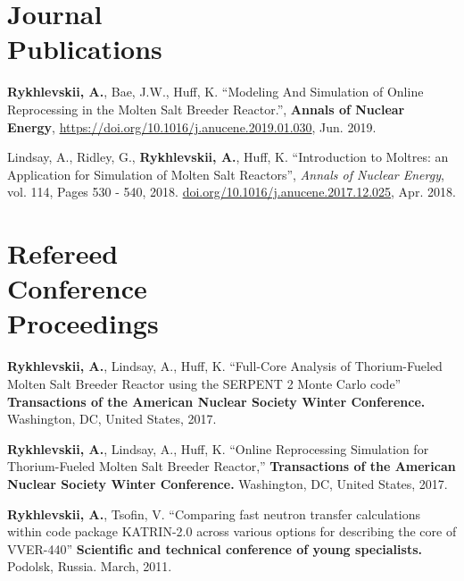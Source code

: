 \documentclass[margin,line]{resume}
\newcommand{\Cyclus}{\textsc{Cyclus}\xspace}%
\begin{document}
\begin{resume}
    \section{\mysidestyle Journal\\Publications}
      \begin{bibenum}
	    \item \textbf{Rykhlevskii, A.}, Bae, J.W., Huff, K. ``Modeling And Simulation of Online Reprocessing in the Molten Salt Breeder Reactor.'', \textbf{Annals of Nuclear Energy}, 
               \url{https://doi.org/10.1016/j.anucene.2019.01.030}, 
               Jun. 2019.
       \item Lindsay, A., Ridley, G., \textbf{Rykhlevskii, A.}, Huff, K. ``Introduction to 
               Moltres: an Application for Simulation of Molten Salt 
               Reactors'',  \textsl{Annals of Nuclear Energy}, vol. 114, Pages 530 - 540, 2018. \url{doi.org/10.1016/j.anucene.2017.12.025}, Apr. 2018.
      \end{bibenum}
\vspace{2mm} %
    \section{\mysidestyle Refereed\\Conference\\Proceedings}
    \begin{bibenum}
    \item \textbf{Rykhlevskii, A.}, Lindsay, A., Huff, K. ``Full-Core Analysis of Thorium-Fueled Molten Salt Breeder Reactor using the SERPENT 2 Monte Carlo code'' 
            \textbf{Transactions of the American Nuclear Society Winter Conference.} 
            Washington, DC, United States, 2017.
    \item \textbf{Rykhlevskii, A.}, Lindsay, A., Huff, K. ``Online Reprocessing Simulation for Thorium-Fueled Molten Salt Breeder Reactor,'' 
            \textbf{Transactions of the American Nuclear Society Winter Conference.} 
            Washington, DC, United States, 2017.
      \item \textbf{Rykhlevskii, A.}, Tsofin, V. ``Comparing fast neutron transfer calculations within code package KATRIN-2.0
across various options for describing the core of VVER-440''
         \textbf{Scientific and technical conference of young specialists.}
         Podolsk, Russia. March, 2011.
	\end{bibenum}

\end{resume}
\end{document}
